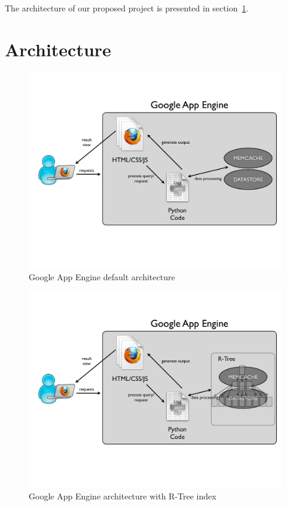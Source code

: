 \documentclass{scrartcl}
\begin{document}
The architecture of our proposed project is presented in section~\ref{sec:architecture}. 

\section{Architecture}
\label{sec:architecture}
\begin{figure}[h]
\begin{center}
\includegraphics[scale=0.3]{fig/gapps1}
\caption{Google App Engine default architecture}
\label{fig:gappsArch}
\end{center}
\end{figure}

\begin{figure}[h]
\begin{center}
\includegraphics[scale=0.3]{fig/gapps2}
\caption{Google App Engine architecture with R-Tree index}
\label{fig:gappsArch2}
\end{center}
\end{figure}
\end{document}
